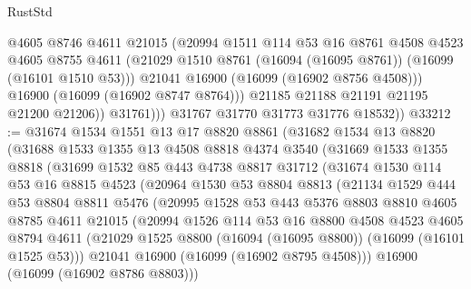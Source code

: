 \begin{lexlean}{RustStd}
\begin{coremodule}
                    @4605
                    @8746
                    @4611
                    @21015
                    (@20994
                      @1511
                      @114
                      @53
                      @16
                      @8761
                      @4508
                      @4523
                      @4605
                      @8755
                      @4611
                      (@21029 @1510 @8761 (@16094 (@16095 @8761)) (@16099 (@16101 @1510 @53)))
                      @21041
                      @16900
                      (@16099 (@16902 @8756 @4508)))
                    @16900
                    (@16099 (@16902 @8747 @8764)))
                  @21185
                  @21188
                  @21191
                  @21195
                  @21200
                  @21206))
              @31761)))
        @31767
        @31770
        @31773
        @31776
        @18532))
@33212 := @31674
    @1534
    @1551
    @13
    @17
    @8820
    @8861
    (@31682
      @1534
      @13
      @8820
      (@31688
        @1533
        @1355
        @13
        @4508
        @8818
        @4374
        @3540
        (@31669
          @1533
          @1355
          @8818
          (@31699
            @1532
            @85
            @443
            @4738
            @8817
            @31712
            (@31674
              @1530
              @114
              @53
              @16
              @8815
              @4523
              (@20964
                @1530
                @53
                @8804
                @8813
                (@21134
                  @1529
                  @444
                  @53
                  @8804
                  @8811
                  @5476
                  (@20995
                    @1528
                    @53
                    @443
                    @5376
                    @8803
                    @8810
                    @4605
                    @8785
                    @4611
                    @21015
                    (@20994
                      @1526
                      @114
                      @53
                      @16
                      @8800
                      @4508
                      @4523
                      @4605
                      @8794
                      @4611
                      (@21029 @1525 @8800 (@16094 (@16095 @8800)) (@16099 (@16101 @1525 @53)))
                      @21041
                      @16900
                      (@16099 (@16902 @8795 @4508)))
                    @16900
                    (@16099 (@16902 @8786 @8803)))

\end{coremodule}
\end{lexlean}
